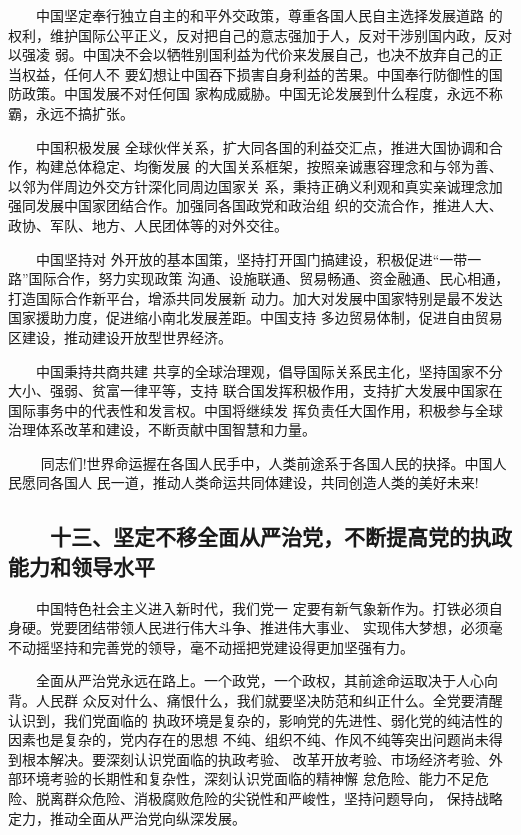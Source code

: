 \documentclass[11pt]{ctexart}
\begin{document}
{{{{　　中国坚定奉行独立自主的和平外交政策，尊重各国人民自主选择发展道路
的权利，维护国际公平正义，反对把自己的意志强加于人，反对干涉别国内政，反对以强凌
弱。中国决不会以牺牲别国利益为代价来发展自己，也决不放弃自己的正当权益，任何人不
要幻想让中国吞下损害自身利益的苦果。中国奉行防御性的国防政策。中国发展不对任何国
家构成威胁。中国无论发展到什么程度，永远不称霸，永远不搞扩张。

　　中国积极发展
全球伙伴关系，扩大同各国的利益交汇点，推进大国协调和合作，构建总体稳定、均衡发展
的大国关系框架，按照亲诚惠容理念和与邻为善、以邻为伴周边外交方针深化同周边国家关
系，秉持正确义利观和真实亲诚理念加强同发展中国家团结合作。加强同各国政党和政治组
织的交流合作，推进人大、政协、军队、地方、人民团体等的对外交往。

　　中国坚持对
外开放的基本国策，坚持打开国门搞建设，积极促进“一带一路”国际合作，努力实现政策
沟通、设施联通、贸易畅通、资金融通、民心相通，打造国际合作新平台，增添共同发展新
动力。加大对发展中国家特别是最不发达国家援助力度，促进缩小南北发展差距。中国支持
多边贸易体制，促进自由贸易区建设，推动建设开放型世界经济。

　　中国秉持共商共建
共享的全球治理观，倡导国际关系民主化，坚持国家不分大小、强弱、贫富一律平等，支持
联合国发挥积极作用，支持扩大发展中国家在国际事务中的代表性和发言权。中国将继续发
挥负责任大国作用，积极参与全球治理体系改革和建设，不断贡献中国智慧和力量。

　　
同志们!世界命运握在各国人民手中，人类前途系于各国人民的抉择。中国人民愿同各国人
民一道，推动人类命运共同体建设，共同创造人类的美好未来!

\subsection{　　十三、坚定不移全面从严治党，不断提高党的执政能力和领导水平}
\label{sec:org390d657}

　　中国特色社会主义进入新时代，我们党一
定要有新气象新作为。打铁必须自身硬。党要团结带领人民进行伟大斗争、推进伟大事业、
实现伟大梦想，必须毫不动摇坚持和完善党的领导，毫不动摇把党建设得更加坚强有力。

　　全面从严治党永远在路上。一个政党，一个政权，其前途命运取决于人心向背。人民群
众反对什么、痛恨什么，我们就要坚决防范和纠正什么。全党要清醒认识到，我们党面临的
执政环境是复杂的，影响党的先进性、弱化党的纯洁性的因素也是复杂的，党内存在的思想
不纯、组织不纯、作风不纯等突出问题尚未得到根本解决。要深刻认识党面临的执政考验、
改革开放考验、市场经济考验、外部环境考验的长期性和复杂性，深刻认识党面临的精神懈
怠危险、能力不足危险、脱离群众危险、消极腐败危险的尖锐性和严峻性，坚持问题导向，
保持战略定力，推动全面从严治党向纵深发展。

}}}}
\end{document}
